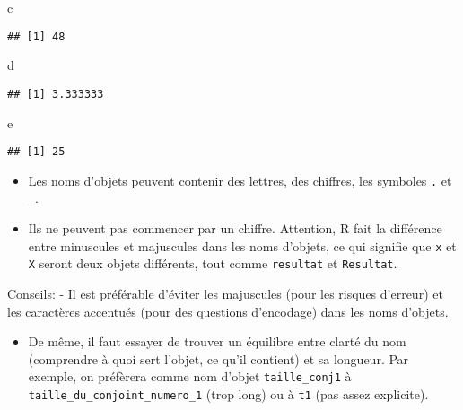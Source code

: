 \documentclass[
]{article}
\newenvironment{Shaded}{\begin{snugshade}}{\end{snugshade}}
\newcommand{\NormalTok}[1]{#1}
\providecommand{\tightlist}{%
  \setlength{\itemsep}{0pt}\setlength{\parskip}{0pt}}
\begin{document}
\begin{Shaded}
\begin{Highlighting}[]
\NormalTok{c}
\end{Highlighting}
\end{Shaded}

\begin{verbatim}
## [1] 48
\end{verbatim}

\begin{Shaded}
\begin{Highlighting}[]
\NormalTok{d}
\end{Highlighting}
\end{Shaded}

\begin{verbatim}
## [1] 3.333333
\end{verbatim}

\begin{Shaded}
\begin{Highlighting}[]
\NormalTok{e}
\end{Highlighting}
\end{Shaded}

\begin{verbatim}
## [1] 25
\end{verbatim}

\begin{infobox}
\begin{itemize}
\item
  Les noms d'objets peuvent contenir des lettres, des chiffres, les
  symboles \texttt{.} et \texttt{\_}.
\item
  Ils ne peuvent pas commencer par un chiffre. Attention, R fait la
  différence entre minuscules et majuscules dans les noms d'objets, ce
  qui signifie que \texttt{x} et \texttt{X} seront deux objets
  différents, tout comme \texttt{resultat} et \texttt{Resultat}.
\end{itemize}

Conseils: - Il est préférable d'éviter les majuscules (pour les risques
d'erreur) et les caractères accentués (pour des questions d'encodage)
dans les noms d'objets.

\begin{itemize}
\tightlist
\item
  De même, il faut essayer de trouver un équilibre entre clarté du nom
  (comprendre à quoi sert l'objet, ce qu'il contient) et sa longueur.
  Par exemple, on préfèrera comme nom d'objet \texttt{taille\_conj1} à
  \texttt{taille\_du\_conjoint\_numero\_1} (trop long) ou à \texttt{t1}
  (pas assez explicite).
\end{itemize}
\end{infobox}
\end{document}

